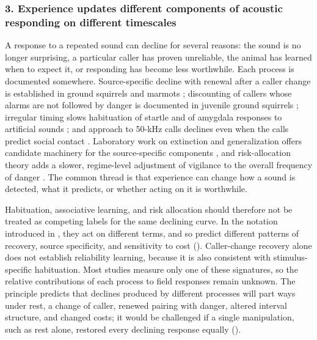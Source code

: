 \subsubsection*{3. Experience updates different components of acoustic responding on different timescales}

A response to a repeated sound can decline for several reasons: the sound is no longer surprising, a particular caller has proven unreliable, the animal has learned when to expect it, or responding has become less worthwhile. Each process is documented somewhere. Source-specific decline with renewal after a caller change is established in ground squirrels and marmots \citep{Hare1998,BlumsteinDaniel2004}; discounting of callers whose alarms are not followed by danger is documented in juvenile ground squirrels \citep{HareAtkins2001}; irregular timing slows habituation of startle and of amygdala responses to artificial sounds \citep{Davis1970,HerryEtAl2007}; and approach to 50-kHz calls declines even when the calls predict social contact \citep{BerzEtAl2022}. Laboratory work on extinction and generalization offers candidate machinery for the source-specific components \citep{SierraMercadoEtAl2011,ConcinaEtAl2018}, and risk-allocation theory adds a slower, regime-level adjustment of vigilance to the overall frequency of danger \citep{LimaBednekoff1999}. The common thread is that experience can change how a sound is detected, what it predicts, or whether acting on it is worthwhile.

Habituation, associative learning, and risk allocation should therefore not be treated as competing labels for the same declining curve. In the notation introduced in , they act on different terms, and so predict different patterns of recovery, source specificity, and sensitivity to cost (). Caller-change recovery alone does not establish reliability learning, because it is also consistent with stimulus-specific habituation. Most studies measure only one of these signatures, so the relative contributions of each process to field responses remain unknown. The principle predicts that declines produced by different processes will part ways under rest, a change of caller, renewed pairing with danger, altered interval structure, and changed costs; it would be challenged if a single manipulation, such as rest alone, restored every declining response equally ().



